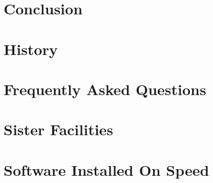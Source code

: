 \documentclass{easychair}
\begin{document}
\section{Conclusion}
\label{sect:conclusion}



\appendix

\section{History}
\label{sect:history}



\section{Frequently Asked Questions}
\label{sect:faqs}

%


\section{Sister Facilities}
\label{sect:sister-facilities}


\section{Software Installed On Speed}
\label{sect:software-list}

\end{document}
